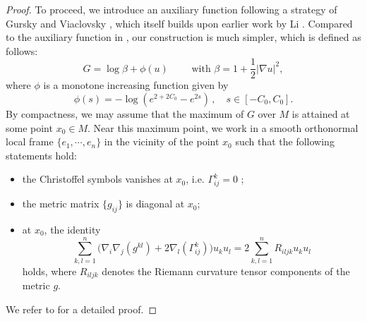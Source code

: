\documentclass{article}
\theoremstyle{plain}
\theoremstyle{definition}
\theoremstyle{definition}
\numberwithin{equation}{section}
\begin{document}
\begin{sloppypar}
\begin{proof}
To proceed, we introduce an auxiliary function following a strategy of Gursky and Viaclovsky \cite{GV03}, which itself builds upon earlier work by Li 
 \cite{Li90}. Compared to the auxiliary function in \cite{GV03}, our construction is much simpler, which is defined as follows:
\begin{equation*}
G=\log\beta +\phi(u) \qquad  \textrm{ with }  \beta=1+\frac{1}{2}|\nabla u|^2, 
\end{equation*}
where $\phi$ is a monotone increasing function  given by
\[
\phi(s)=-\log (e^{2+2C_{0}}-e^{2s})\,, \quad s\in [-C_{0},C_{0}].
\]
By compactness, we may assume that the maximum of $G$ over $M$ is attained at some point $x_0 \in M$. Near this maximum point, we work in a smooth orthonormal local frame $\{e_1,\cdots,e_n\}$ in the vicinity of the point $x_0$ such that the following statements hold:
\begin{itemize}\itemsep 0.4em
\item the Christoffel symbols vanishes at $x_0$, i.e. $\Gamma_{ij}^{k}=0$ ;
\item the metric matrix $\big\{g_{ij}\big\}$ is diagonal at $x_0$; 
\item  at $x_0$, the identity
\begin{equation}\label{normal coodinates}
\sum_{k,l=1}^{n}\bigg(\nabla_{i}\nabla_{j}(g^{kl})+2\nabla_{l}(\Gamma_{ij}^{k})\bigg)u_{k}u_{l}=2\sum_{k,l=1}^{n}R_{iljk}u_{k}u_{l} 
\end{equation}
holds, where $R_{iljk}$ denotes the Riemann curvature tensor components of the metric $g$.
\end{itemize}
We refer to \cite{Via02} for a detailed proof.


\end{proof}
\end{sloppypar}
\end{document}
